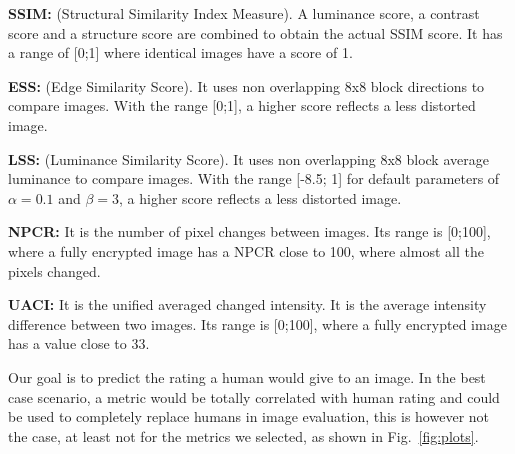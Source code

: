 \documentclass{article}
\begin{document}
\textbf{SSIM\cite{wang2004image}:} (Structural Similarity Index Measure). A luminance score, a contrast score and a structure score are combined to obtain the actual SSIM score. It has a range of [0;1] where identical images have a score of 1.

\textbf{ESS\cite{mao2004security}:} (Edge Similarity Score). It uses non overlapping 8x8 block directions to compare images. With the range [0;1], a higher score reflects a less distorted image.

\textbf{LSS\cite{mao2004security}:} (Luminance Similarity Score). It uses non overlapping 8x8 block average luminance to compare images. With the range [-8.5; 1] for default parameters of $\alpha=0.1$ and $\beta=3$, a higher score reflects a less distorted image.

\textbf{NPCR\cite{chen2004symmetric, mao2004novel}:} It is the number of pixel changes between images. Its range is [0;100], where a fully encrypted image has a NPCR close to 100, where almost all the pixels changed.

\textbf{UACI\cite{chen2004symmetric, mao2004novel}:} It is the unified averaged changed intensity. It is the average intensity difference between two images. Its range is [0;100], where a fully encrypted image has a value close to 33.




Our goal is to predict the rating a human would give to an image. In the best case scenario, a metric would be totally correlated with human rating and could be used to completely replace humans in image evaluation, this is however not the case, at least not for the metrics we selected, as shown in Fig.~\ref{fig:plots}.
\end{document}
